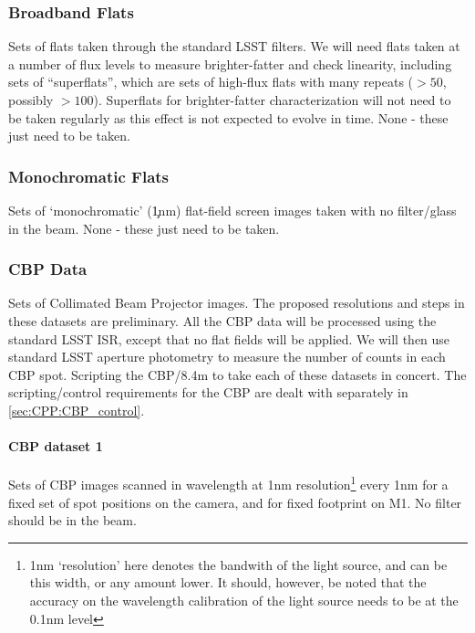 \subsubsection{Broadband Flats}\label{sec:CPP:inputs:broadFlat}
Sets of flats taken through the standard LSST filters. We will need flats taken at a number of flux levels to measure brighter-fatter and check linearity, including sets of ``superflats'', which are sets of high-flux flats with many repeats ($>50$, possibly $>100$). Superflats for brighter-fatter characterization will not need to be taken regularly as this effect is not expected to evolve in time.
\alg None - these just need to be taken.


\subsubsection{Monochromatic Flats}\label{sec:CPP:inputs:monoFlat}
Sets of `monochromatic' (\c 1nm) flat-field screen images taken with no filter/glass in the beam.
\alg None - these just need to be taken.


\subsubsection{CBP Data}\label{sec:CPP:inputs:CBP}
Sets of Collimated Beam Projector images. The proposed resolutions and steps in these datasets are preliminary. All the CBP data will be processed using the standard LSST ISR, except that no flat fields will be applied. We will then use standard LSST aperture photometry to measure the number of counts in each CBP spot.
\alg Scripting the CBP/8.4m to take each of these datasets in concert. The scripting/control requirements for the CBP are dealt with separately in \secsymbol\ref{sec:CPP:CBP_control}.


\paragraph{CBP dataset 1}\label{sec:CPP:inputs:CBP:mono}
Sets of CBP images scanned in wavelength at 1nm resolution\footnote{1nm `resolution' here denotes the bandwith of the light source, and can be this width, or any amount lower. It should, however, be noted that the accuracy on the wavelength calibration of the light source needs to be at the 0.1nm level } every 1nm for a fixed set of spot positions on the camera, and for fixed footprint on M1. No filter should be in the beam.
	
